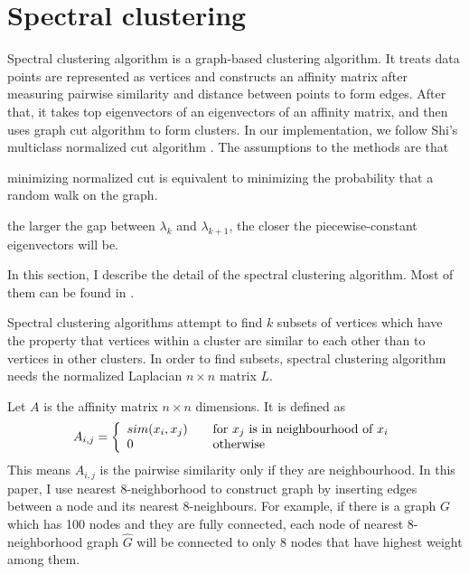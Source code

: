 \section{Spectral clustering}
\label{sec:spectralclustering}
Spectral clustering algorithm is a graph-based clustering algorithm. 
It treats data points are represented as vertices and constructs an affinity matrix after measuring pairwise similarity and distance between points to form edges. 
After that, it takes top eigenvectors of an eigenvectors of an affinity matrix, and then uses graph cut algorithm to form clusters. 
In our implementation, we follow Shi's multiclass normalized cut algorithm \cite{jianbo03}. 
The assumptions to the methods are that \begin{inparaenum}[\itshape a\upshape)]
\item minimizing normalized cut is equivalent to minimizing the probability that a random walk on the graph.
\item the larger the gap between $\lambda_{k}$ and $\lambda_{k+1}$, the closer the piecewise-constant eigenvectors will be.
\end{inparaenum}
In this section, I describe the detail of the spectral clustering algorithm. 
Most of them can be found in \cite{ulrike07}. 

Spectral clustering algorithms attempt to find $k$ subsets of vertices which have the property that vertices within a cluster are similar to each other than to vertices in other clusters. 
In order to find subsets, spectral clustering algorithm needs the normalized Laplacian $n \times n$ matrix $L$. 

Let $A$ is the affinity matrix $n \times n$ dimensions. It is defined as 
\begin{equation}
A_{i,j} = \left\{ 
  \begin{array}{l l}
    sim(x_i, x_j) & \quad \text{for $x_j$ is in neighbourhood of $x_i$}\\
    0 & \quad \text{otherwise}
  \end{array} \right.
\end{equation}
This means $A_{i,j}$ is the pairwise similarity only if they are neighbourhood. 
In this paper, I use nearest 8-neighborhood to construct graph by inserting edges between a node and its nearest 8-neighbours. 
For example, if there is a graph $G$ which has 100 nodes and they are fully connected, each node of nearest 8-neighborhood graph $\hat{G}$ will be connected to only 8 nodes that have highest weight among them. 

